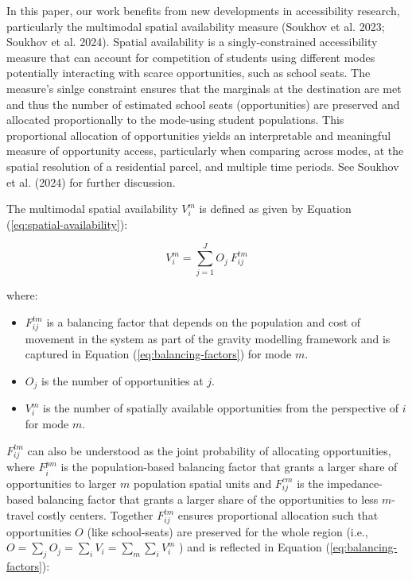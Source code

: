 \documentclass[
default
]{sn-jnl}
\providecommand{\tightlist}{%
  \setlength{\itemsep}{0pt}\setlength{\parskip}{0pt}}\usepackage{longtable,booktabs,array}
\begin{document}
In this paper, our work benefits from new developments in accessibility
research, particularly the multimodal spatial availability measure
(Soukhov et al. 2023; Soukhov et al. 2024). Spatial availability is a
singly-constrained accessibility measure that can account for
competition of students using different modes potentially interacting
with scarce opportunities, such as school seats. The measure's sinlge
constraint ensures that the marginals at the destination are met and
thus the number of estimated school seats (opportunities) are preserved
and allocated proportionally to the mode-using student populations. This
proportional allocation of opportunities yields an interpretable and
meaningful measure of opportunity access, particularly when comparing
across modes, at the spatial resolution of a residential parcel, and
multiple time periods. See Soukhov et al. (2024) for further discussion.

The multimodal spatial availability \(V_{i}^m\) is defined as given by
Equation (\ref{eq:spatial-availability}):

\begin{equation}
\label{eq:spatial-availability}
V_{i}^{m} = \sum_{j=1}^J O_j\ F^{tm}_{ij}
\end{equation}

\noindent where:

\begin{itemize}
\tightlist
\item
  \(F^{tm}_{ij}\) is a balancing factor that depends on the population
  and cost of movement in the system as part of the gravity modelling
  framework and is captured in Equation (\ref{eq:balancing-factors}) for
  mode \(m\).
\item
  \(O_j\) is the number of opportunities at \(j\).
\item
  \(V_i^m\) is the number of spatially available opportunities from the
  perspective of \(i\) for mode \(m\).
\end{itemize}

\(F^{tm}_{ij}\) can also be understood as the joint probability of
allocating opportunities, where \(F^{pm}_{i}\) is the population-based
balancing factor that grants a larger share of opportunities to larger
\(m\) population spatial units and \(F^{cm}_{ij}\) is the
impedance-based balancing factor that grants a larger share of the
opportunities to less \(m\)-travel costly centers. Together
\(F^{tm}_{ij}\) ensures proportional allocation such that opportunities
\(O\) (like school-seats) are preserved for the whole region (i.e.,
\(O = \sum_{j} O_j = \sum_{i} V_i = \sum_{m}\sum_{i} V_i^m\) ) and is
reflected in Equation (\ref{eq:balancing-factors}):
\end{document}

